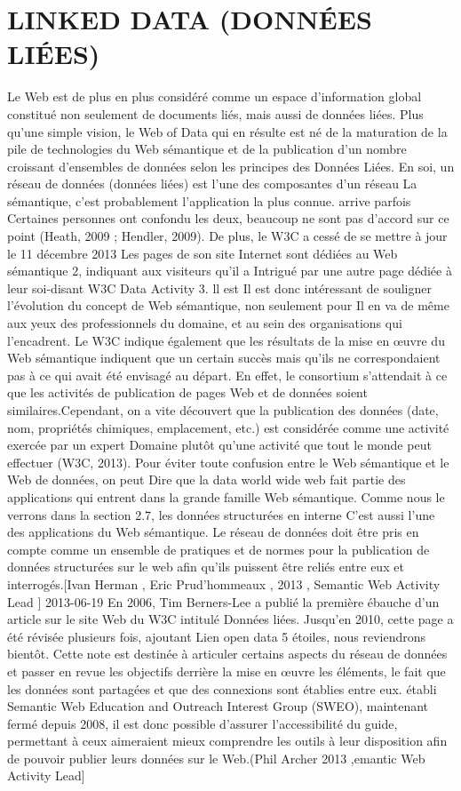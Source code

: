 \documentclass[12pt]{report}
\begin{document}
\section{LINKED DATA (DONNÉES LIÉES)}
Le Web est de plus en plus considéré comme un espace d’information global constitué non seulement de documents liés, mais aussi de données liées. Plus qu’une simple vision, le Web of Data qui en résulte est né de la maturation de la pile de technologies du Web sémantique et de la publication d’un nombre croissant d’ensembles de données selon les principes des Données Liées.\cite{LDOW}
En soi, un réseau de données (données liées) est l'une des composantes d'un réseau La sémantique, c'est probablement l'application la plus connue. arrive parfois Certaines personnes ont confondu les deux, beaucoup ne sont pas d'accord sur ce point (Heath, 2009 ; Hendler, 2009). De plus, le W3C a cessé de se mettre à jour le 11 décembre 2013 Les pages de son site Internet sont dédiées au Web sémantique 2, indiquant aux visiteurs qu'il a Intrigué par une autre page dédiée à leur soi-disant W3C Data Activity 3. ll est Il est donc intéressant de souligner l'évolution du concept de Web sémantique, non seulement pour Il en va de même aux yeux des professionnels du domaine, et au sein des organisations qui l'encadrent. Le W3C indique également que les résultats de la mise en œuvre du Web sémantique indiquent que un certain succès mais qu’ils ne correspondaient pas à ce qui avait été envisagé au départ. En effet, le consortium s’attendait à ce que les activités de publication de pages Web et de données soient similaires.Cependant, on a vite découvert que la publication des données (date, nom, propriétés chimiques, emplacement, etc.) est considérée comme une activité exercée par un expert Domaine plutôt qu'une activité que tout le monde peut effectuer (W3C, 2013). Pour éviter toute confusion entre le Web sémantique et le Web de données, on peut Dire que la data world wide web fait partie des applications qui entrent dans la grande famille Web sémantique. Comme nous le verrons dans la section 2.7, les données structurées en interne C'est aussi l'une des applications du Web sémantique. Le réseau de données doit être pris en compte comme un ensemble de pratiques et de normes pour la publication de données structurées sur le web afin qu'ils puissent être reliés entre eux et interrogés.[Ivan Herman , Eric Prud'hommeaux , 2013 , Semantic Web Activity Lead ]
2013-06-19
En 2006, Tim Berners-Lee a publié la première ébauche d'un article sur le site Web du W3C intitulé Données liées. Jusqu'en 2010, cette page a été révisée plusieurs fois, ajoutant Lien open data 5 étoiles, nous reviendrons bientôt. Cette note est destinée à articuler certains aspects du réseau de données et passer en revue les objectifs derrière la mise en œuvre les éléments, le fait que les données sont partagées et que des connexions sont établies entre eux. établi
Semantic Web Education and Outreach Interest Group (SWEO), maintenant fermé depuis 2008, il est donc possible d'assurer l'accessibilité du guide, permettant à ceux aimeraient mieux comprendre les outils à leur disposition afin de pouvoir publier leurs données sur le Web.(Phil Archer 2013 ,emantic Web Activity Lead]
\end{document}
